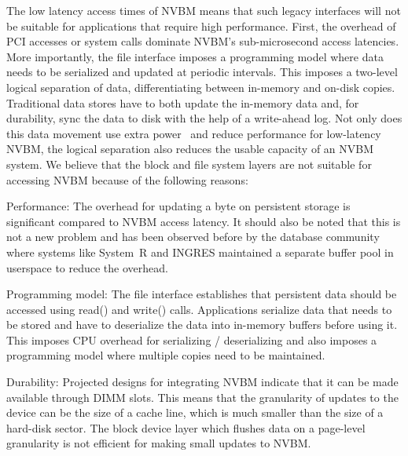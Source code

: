 The low latency access times of NVBM means that such legacy interfaces will not
be suitable for applications that require high performance. First, the overhead
of PCI accesses or system calls dominate NVBM's sub-microsecond access
latencies. More importantly, the file interface imposes a programming model
where data needs to be serialized and updated at periodic intervals.  This
imposes a two-level logical separation of data, differentiating between
in-memory and on-disk copies.  Traditional data stores have to both update the
in-memory data and, for durability, sync the data to disk with the help of a
write-ahead log.  Not only does this data movement use extra
power~\citep{Bergman08} and reduce performance for low-latency NVBM, the
logical separation also reduces the usable capacity of an NVBM system. We
believe that the block and file system layers are not suitable for accessing
NVBM because of the following reasons: 
\begin{smitemize}
\item Performance: The overhead for updating a byte on persistent
  storage is significant compared to NVBM access latency. It should
  also be noted that this is not a new problem and has been observed
  before by the database community~\cite{Stonebraker81} where systems 
  like System~R and INGRES maintained a separate buffer pool in userspace to
  reduce the overhead.
\item Programming model: The file interface establishes that
  persistent data should be accessed using read() and write() 
  calls. Applications serialize data that needs to be stored and have
  to deserialize the data into in-memory buffers before using
  it. This imposes CPU overhead for serializing / deserializing and
  also imposes a programming model where multiple copies need to be
  maintained.
\item Durability: Projected designs for integrating NVBM indicate that
  it can be made available through DIMM slots. This means that the
  granularity of updates to the device can be the size of a cache line,
  which is much smaller than the size of a hard-disk sector. The block
  device layer which flushes data on a page-level granularity is not
  efficient for making small updates to NVBM.
\end{smitemize}

